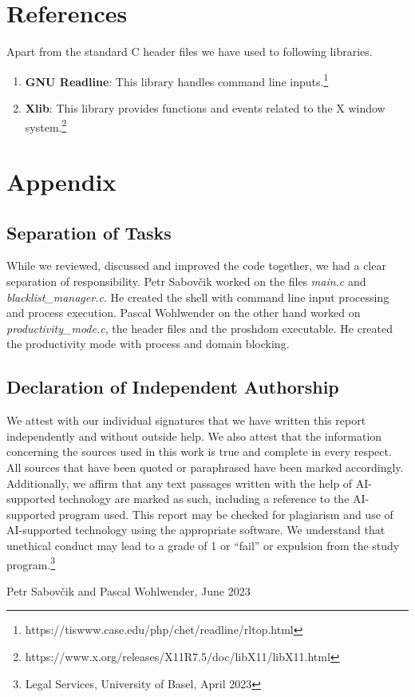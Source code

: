 \documentclass{article}
\begin{document}
\section{References}

Apart from the standard C header files we have used to following libraries.

\begin{enumerate}
	\item \textbf{GNU Readline}: This library handles command line inputs.\footnote{https://tiswww.case.edu/php/chet/readline/rltop.html}
	\item \textbf{Xlib}: This library provides functions and events related to the X window system.\footnote{https://www.x.org/releases/X11R7.5/doc/libX11/libX11.html}
\end{enumerate}

\pagebreak

\section{Appendix}

\subsection{Separation of Tasks}

While we reviewed, discussed and improved the code together, we had a clear separation of responsibility. Petr Sabovčik worked on the files \textit{main.c} and \textit{blacklist\_manager.c}. He created the shell with command line input processing and process execution. Pascal Wohlwender on the other hand worked on \textit{productivity\_mode.c}, the header files and the proshdom executable. He created the productivity mode with process and domain blocking.

\subsection{Declaration of Independent Authorship}

We attest with our individual signatures that we have written this report independently and without outside
help. We also attest that the information concerning the sources used in this work is true and complete in every
respect. All sources that have been quoted or paraphrased have been marked accordingly.
Additionally, we affirm that any text passages written with the help of AI-supported technology are marked as
such, including a reference to the AI-supported program used.
This report may be checked for plagiarism and use of AI-supported technology using the appropriate software.
We understand that unethical conduct may lead to a grade of 1 or “fail” or expulsion from the study program.\footnote{Legal Services, University of Basel, April 2023}

\begin{flushright}
Petr Sabovčik and Pascal Wohlwender, June 2023
\end{flushright}
\end{document}
